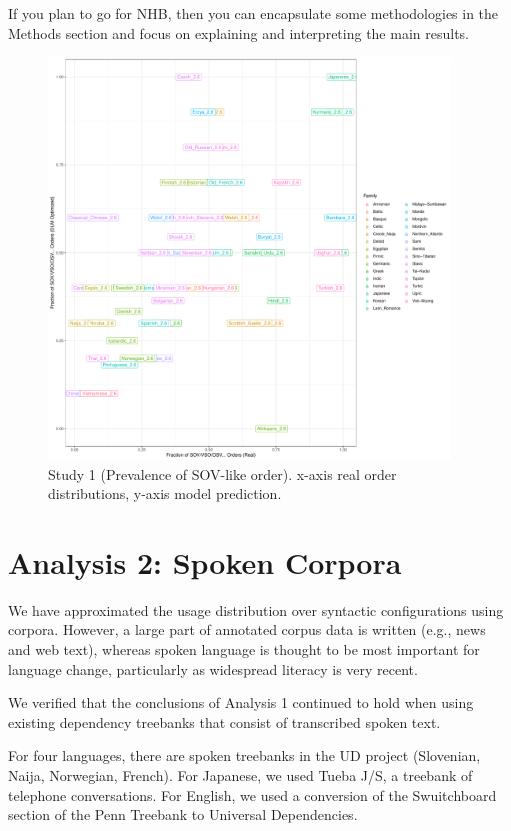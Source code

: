 \documentclass[11pt,a4paper]{article}
\begin{document}
{\color{blue} If you plan to go for NHB, then you can encapsulate some methodologies in the Methods section and focus on explaining and interpreting the main results.}


\begin{figure}
    \centering
    \includegraphics[width=0.95\textwidth]{figures/fracion-optimized_DLM_2.6.pdf}
    \caption{Study 1 (Prevalence of SOV-like order). x-axis real order distributions, y-axis model prediction.}
    \label{fig:study1}
\end{figure}


\section{Analysis 2: Spoken Corpora}

We have approximated the usage distribution over syntactic configurations using corpora.
However, a large part of annotated corpus data is written (e.g., news and web text), whereas spoken language is thought to be most important for language change, particularly as widespread literacy is very recent.

We verified that the conclusions of Analysis 1 continued to hold when using existing dependency treebanks that consist of transcribed spoken text.

For four languages, there are spoken treebanks in the UD project (Slovenian, Naija, Norwegian, French).
For Japanese, we used Tueba J/S, a treebank of telephone conversations.
For English, we used a conversion of the Swuitchboard section of the Penn Treebank to Universal Dependencies.
\end{document}
